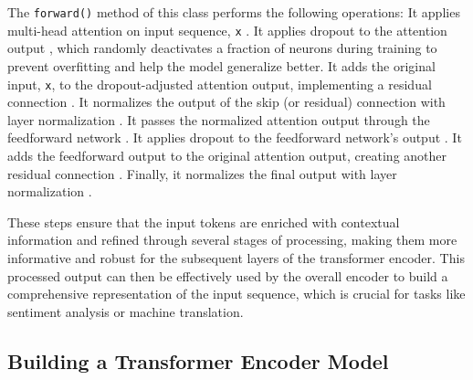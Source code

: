 The \lstinline{forward()} method of this class performs the following operations:
It applies multi-head attention on input sequence, \lstinline{x} . It applies dropout to the attention output , which randomly deactivates a fraction of neurons during training to prevent overfitting and help the model generalize better. It adds the original input, \lstinline{x}, to the dropout-adjusted attention output, implementing a residual connection . It normalizes the output of the skip (or residual) connection with layer normalization . It passes the normalized attention output through the feedforward network . It applies dropout to the feedforward network's output . It adds the feedforward output to the original attention output, creating another residual connection . Finally, it normalizes the final output with layer normalization .

These steps ensure that the input tokens are enriched with contextual information and refined through several stages of processing, making them more informative and robust for the subsequent layers of the transformer encoder. This processed output can then be effectively used by the overall encoder to build a comprehensive representation of the input sequence, which is crucial for tasks like sentiment analysis or machine translation.

\subsection{Building a Transformer Encoder Model}

